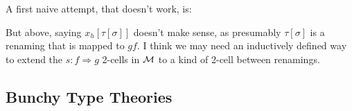 \documentclass[10pt]{article}
\let\emptyset\varnothing
\newcommand{\yields}{\vdash}
\newcommand{\type}{\,\,\mathsf{mtype}}
\DeclareMathOperator{\ob}{ob}
\begin{document}
A first naive attempt, that doesn't work, is:

But above, saying $x_h[\tau[\sigma]]$ doesn't make sense, as presumably $\tau[\sigma]$ is a renaming that is mapped to $gf$. I think we may need an inductively defined way to extend the $s : f \Rightarrow g$ 2-cells in $\mathcal{M}$ to a kind of 2-cell between renamings. 

\subsection{Bunchy Type Theories}
\end{document}
